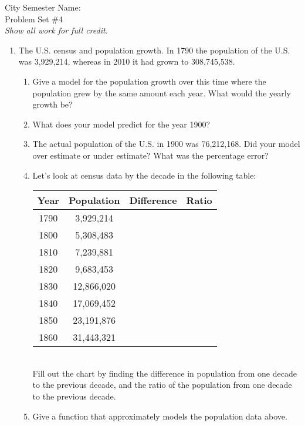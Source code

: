 \documentclass[12pt]{article}
\theoremstyle{plain}     %
\begin{document}
\large
City Semester  \hspace{8cm} Name:\makebox[6cm]{\hrulefill}
\\
Problem Set \#4\\
\normalsize 
\emph{Show all work for full credit.}\\
\begin{enumerate}
	\item The U.S. census and population growth. In 1790 the population of the U.S. was 3,929,214, whereas in 2010 it had grown to 308,745,538.
	
		\begin{enumerate}
			\item Give a model for the population growth over this time where the population grew by the same amount each year. What would the yearly growth be?\\
			\item What does your model predict for the year 1900?\\
			\item The actual population of the U.S. in 1900 was 76,212,168. Did your model over estimate or under estimate? What was the percentage error?\\
			\item Let's look at census data by the decade in the  following table:\\
			\begin{tabular}{c | c | c |c}
				Year & Population & Difference & Ratio\\
				\hline
				1790 & 3,929,214 & &\\
				1800 & 5,308,483 & &\\
				1810 & 7,239,881 & &\\
				1820 & 9,683,453 & &\\
				1830 & 12,866,020 & &\\
				1840 & 17,069,452 & &\\
				1850 & 23,191,876 & &\\
				1860 & 31,443,321 & &\\
			\end{tabular}\\[.5cm]
			Fill out the chart by finding the difference in population from one decade to the previous decade, and the ratio of the population from one decade to the previous decade.
			\item Give a function that approximately models the population data above.\\[1cm]
			

\end{enumerate}
\end{enumerate}
\end{document}

